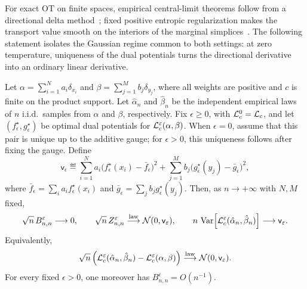 For exact OT on finite spaces, empirical central-limit theorems follow from a directional delta method~\cite{sommerfeld2018inference,tameling2017empirical}; fixed positive entropic regularization makes the transport value smooth on the interiors of the marginal simplices~\cite{bigot2017central,klatt2020empirical,hundrieser2021limit,mena2019statistical}. The following statement isolates the Gaussian regime common to both settings: at zero temperature, uniqueness of the dual potentials turns the directional derivative into an ordinary linear derivative.

\begin{prop}\label{prop-finite-ot-clt}
	Let \(\alpha=\sum_{i=1}^{N}a_i\delta_{x_i}\) and \(\beta=\sum_{j=1}^{M}b_j\delta_{y_j}\), where all weights are positive and \(c\) is finite on the product support. Let \(\hat\alpha_n\) and \(\hat\beta_n\) be the independent empirical laws of \(n\) i.i.d.\ samples from \(\alpha\) and \(\beta\), respectively. Fix \(\epsilon\geq0\), with \(\mathcal{L}_c^0=\mathcal{L}_c\), and let \((f_\epsilon^\star,g_\epsilon^\star)\) be optimal dual potentials for \(\mathcal{L}_c^\varepsilon(\alpha,\beta)\). When \(\epsilon=0\), assume that this pair is unique up to the additive gauge; for \(\epsilon>0\), this uniqueness follows after fixing the gauge. Define
	\[
		\mathsf{v}_\epsilon
		\eqdef
		\sum_{i=1}^{N}a_i\bigl(f_\epsilon^\star(x_i)-\bar f_\epsilon\bigr)^2
		+
		\sum_{j=1}^{M}b_j\bigl(g_\epsilon^\star(y_j)-\bar g_\epsilon\bigr)^2,
	\]
	where \(\bar f_\epsilon=\sum_i a_i f_\epsilon^\star(x_i)\) and \(\bar g_\epsilon=\sum_j b_j g_\epsilon^\star(y_j)\). Then, as \(n\to+\infty\) with \(N,M\) fixed,
	\[
		\sqrt n\,B_{n,n}^\varepsilon\longrightarrow0,
		\qquad
		\sqrt n\,Z_{n,n}^\varepsilon\overset{\mathrm{law}}{\longrightarrow}\mathcal{N}(0,\mathsf{v}_\varepsilon),
		\qquad
		n\,\operatorname{Var}\!\left[\mathcal{L}_c^\varepsilon(\hat\alpha_n,\hat\beta_n)\right]
		\longrightarrow\mathsf{v}_\varepsilon.
	\]
	Equivalently,
	\[
		\sqrt n\left(
		\mathcal{L}_c^\varepsilon(\hat\alpha_n,\hat\beta_n)
		-
		\mathcal{L}_c^\varepsilon(\alpha,\beta)
		\right)
		\overset{\mathrm{law}}{\longrightarrow}\mathcal{N}(0,\mathsf{v}_\varepsilon).
	\]
	For every fixed \(\epsilon>0\), one moreover has \(B_{n,n}^\epsilon=O(n^{-1})\).
\end{prop}

